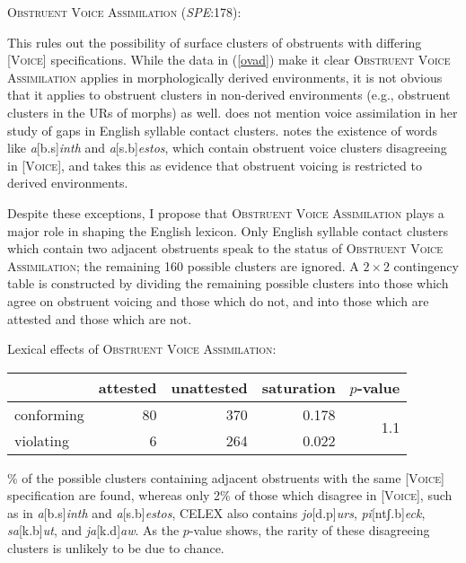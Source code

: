 \ex \textsc{Obstruent Voice Assimilation} (\emph{SPE}:178): \\
\label{ovar} \xe

\noindent
This rules out the possibility of surface clusters of obstruents with differing  [\textsc{Voice}] specifications. While the data in (\ref{ovad}) make it clear \textsc{Obstruent Voice Assimilation} applies in morphologically derived environments, it is not obvious that it applies to obstruent clusters in non-derived environments (e.g., obstruent clusters in the URs of morphs) as well. \citet{Pierrehumbert1994} does not mention voice assimilation in her study of gaps in English syllable contact clusters. \citet[][74f.]{Hammond1999a} notes the existence of words like \emph{a}[b.s]\emph{inth} and \emph{a}[s.b]\emph{estos}, which contain obstruent voice clusters disagreeing in [\textsc{Voice}], and takes this as evidence that obstruent voicing is restricted to derived environments.

Despite these exceptions, I propose that \textsc{Obstruent Voice Assimilation} plays a major role in shaping the English lexicon. Only English syllable contact clusters which contain two adjacent obstruents speak to the status of \textsc{Obstruent Voice Assimilation}; the remaining 160 possible clusters are ignored.
A $2 \times 2$ contingency table is constructed by dividing the remaining possible clusters into those which agree on obstruent voicing and those which do not, 
and into those which are attested and those which are not.

\ex Lexical effects of \textsc{Obstruent Voice Assimilation}: \vspace{6pt} \\
\begin{tabular}{l r r r r}
\toprule
           & attested & unattested & saturation & $p$-value \\
\midrule
conforming & 80 & 370 & 0.178 & \multirow{2}{*}{1.1\e{-11}}\\
violating  &  6 & 264 & 0.022 \\
\bottomrule
\end{tabular} \xe

\% of the possible clusters containing adjacent obstruents with the same [\textsc{Voice}] specification are found, 
whereas only 2\%  of those which disagree in [\textsc{Voice}], 
such as in \emph{a}[b.s]\emph{inth} and \emph{a}[s.b]\emph{estos}, 
CELEX also contains \emph{jo}[d.p]\emph{urs}, \emph{pi}[ntʃ.b]\emph{eck}, \emph{sa}[k.b]\emph{ut}, and \emph{ja}[k.d]\emph{aw}. 
As the $p$-value shows, 
the rarity of these disagreeing clusters is unlikely to be due to chance. 

